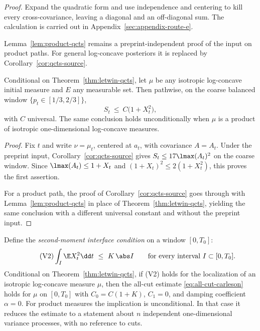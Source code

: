 \documentclass[../../main.tex]{subfiles}
\begin{document}
\noindent\emph{Proof.} Expand the quadratic form and use independence and centering to kill every cross-covariance, leaving a diagonal and an off-diagonal sum. The calculation is carried out in Appendix~\ref{sec:appendix-route-e}.

Lemma~\ref{lem:product-qcts} remains a preprint-independent proof of the input on product paths.
For general log-concave posteriors it is replaced by Corollary~\ref{cor:qcts-source}.

\begin{theorem}
\label{thm:covariance-bound}
Conditional on Theorem~\ref{thm:letwin-qcts}, let $\mu$ be any isotropic log-concave initial
measure and $E$ any measurable set. Then pathwise, on the coarse balanced window
$\{p_t\in[1/3,2/3]\}$,
\begin{equation}\label{eq:S-le-X2}
  S_t\ \le\ C\bigl(1+X_t^2\bigr),
\end{equation}
with $C$ universal. The same conclusion holds unconditionally when $\mu$ is a product of
isotropic one-dimensional log-concave measures.
\end{theorem}

\begin{proof}
Fix $t$ and write $\nu=\mu_t$, centered at $a_t$, with covariance $A=A_t$. Under the preprint
input, Corollary~\ref{cor:qcts-source} gives $S_t\le17\lmax(A_t)^2$ on the coarse window. Since
$\lmax(A_t)\le1+X_t$ and $(1+X_t)^2\le2(1+X_t^2)$, this proves the first assertion.

For a product path, the proof of Corollary~\ref{cor:qcts-source} goes through with
Lemma~\ref{lem:product-qcts} in place of Theorem~\ref{thm:letwin-qcts}, yielding the same
conclusion with a different universal constant and without the preprint input.
\end{proof}

\begin{corollary}
\label{cor:V2-implies}
Define the \emph{second-moment interface condition} on a window $[0,T_0]$:
\begin{equation}\label{eq:V2}
  \tag{V2}
  \int_I\E X_t^2\dd t\ \le\ K\,\abs I
  \qquad\text{for every interval }I\subset[0,T_0].
\end{equation}
Conditional on Theorem~\ref{thm:letwin-qcts}, if \textup{(V2)} holds for the localization of an
isotropic log-concave measure $\mu$, then the all-cut estimate
\eqref{eq:all-cut-carleson} holds for $\mu$ on $[0,T_0]$ with $C_0=C(1+K)$, $C_1=0$, and damping
coefficient $\alpha=0$. For product measures the implication is unconditional. In that case it
reduces the estimate to a statement about $n$ independent one-dimensional variance processes,
with no reference to cuts.
\end{corollary}
\end{document}
